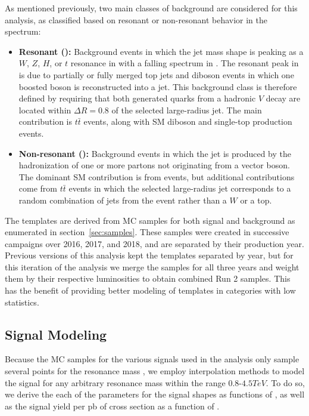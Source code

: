 As mentioned previously, two main classes of background are considered for this analysis, as classified based on resonant or non-resonant behavior in the \MJ spectrum:
\begin{itemize}
  \item \textbf{Resonant (\WVt):} Background events in which the jet mass shape is peaking as a $W$, $Z$, $H$, or $t$ resonance in \MJ with a falling spectrum in \MVV.
  The resonant peak in \MJ is due to partially or fully merged top jets and diboson events in which one boosted boson is reconstructed into a jet.
  This background class is therefore defined by requiring that both generated quarks from a hadronic $V$ decay are located within $\Delta R=0.8$ of the selected large-radius jet.
  The main contribution is $t\bar{t}$ events, along with SM diboson and single-top production events.
  \item \textbf{Non-resonant (\Wjets):} Background events in which the jet is produced by the hadronization of one or more partons not originating from a vector boson.
  The dominant SM contribution is from \Wjets events, but additional contributions come from $t\bar{t}$ events in which the selected large-radius jet corresponds to a random combination of jets from the event rather than a $W$ or a top.
\end{itemize}

The templates are derived from MC samples for both signal and background as enumerated in section~\ref{sec:samples}.
These samples were created in successive campaigns over 2016, 2017, and 2018, and are separated by their production year.
Previous versions of this analysis kept the templates separated by year, but for this iteration of the analysis we merge the samples for all three years and weight them by their respective luminosities to obtain combined Run 2 samples.
This has the benefit of providing better modeling of templates in categories with low statistics.

\subsection{Signal Modeling}
\label{sec:sig}

Because the MC samples for the various signals used in the analysis only sample several points for the resonance mass \MX, we employ interpolation methods to model the signal for any arbitrary resonance mass \MX within the range 0.8-$4.5\unit{TeV}$.
To do so, we derive the each of the parameters for the signal shapes as functions of \MX, as well as the signal yield per pb of cross section as a function of \MX.

